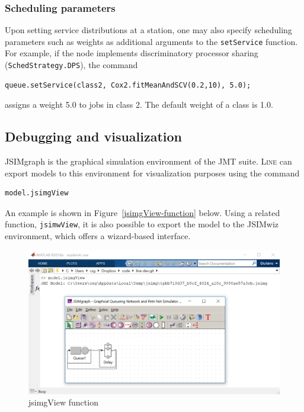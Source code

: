 \subsubsection{Scheduling parameters}
\label{scheduling-parameters}
Upon setting service distributions at a station, one may also specify scheduling parameters such as weights as additional arguments to the \texttt{setService} function. For example, if the node implements discriminatory processor sharing (\texttt{SchedStrategy.DPS}), the command
\begin{lstlisting}
queue.setService(class2, Cox2.fitMeanAndSCV(0.2,10), 5.0);
\end{lstlisting}
assigns a weight 5.0 to jobs in class 2. The default weight of a class is 1.0.

\subsection{Debugging and visualization}
JSIMgraph is the graphical simulation environment of the JMT suite. \textsc{Line} can export models to this environment for visualization purposes using the command
\begin{lstlisting}
model.jsimgView
\end{lstlisting}
An example is shown in Figure~\autoref{jsimgView-function} below. Using a related function, \texttt{jsimwView}, it is also possible to export the model to the JSIMwiz environment, which offers a wizard-based interface.
\begin{figure}
  \centering
  \includegraphics[width=14cm]{./images/jsimgView.png}
  \caption{jsimgView function}\label{jsimgView-function}
\end{figure}

